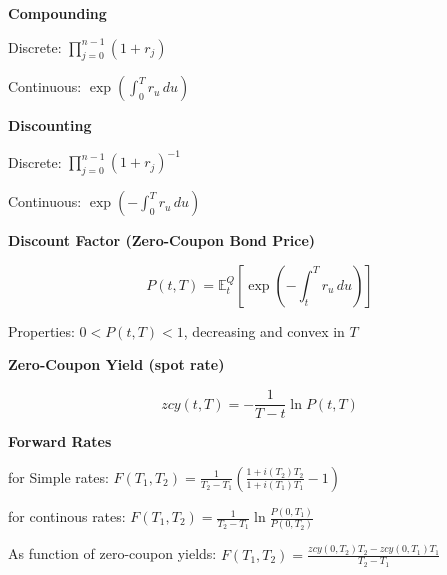 \documentclass[12pt,a4paper]{article}
\begin{document}
\textbf{Compounding}
\vspace{0.5em}

Discrete: $\prod_{j=0}^{n-1} (1 + r_j)$ \quad [$r_j$ = spot rate at beginning of period $j$]

Continuous: $\exp\left(\int_0^T r_u \, du\right)$ \quad [$\{r_u\}_{u \geq 0}$ = stochastic process for instantaneous risk-free rate]

\vspace{0.5em}

\textbf{Discounting}
\vspace{0.5em}

Discrete: $\prod_{j=0}^{n-1} (1 + r_j)^{-1}$ 

Continuous: $\exp\left(-\int_0^T r_u \, du\right)$

\vspace{0.5em}




\textbf{Discount Factor (Zero-Coupon Bond Price)}
\vspace{0.5em}


$$P(t,T) = \mathbb{E}_t^Q\left[\exp\left(-\int_t^T r_u \, du\right)\right]$$


Properties: $0 < P(t,T) < 1$, decreasing and convex in $T$

\vspace{0.5em}

\textbf{Zero-Coupon Yield (spot rate)}
\vspace{0.5em}

$$zcy(t,T) = -\frac{1}{T-t} \ln P(t,T)$$

\vspace{0.5em}

\textbf{Forward Rates}
\vspace{0.5em}

for Simple rates: $F(T_1, T_2) = \frac{1}{T_2 - T_1}\left(\frac{1 + i(T_2)T_2}{1 + i(T_1)T_1} - 1\right)$

for continous rates: $F(T_1, T_2) = \frac{1}{T_2 - T_1} \ln\frac{P(0,T_1)}{P(0,T_2)}$

As function of zero-coupon yields: $F(T_1, T_2) = \frac{zcy(0,T_2)T_2 - zcy(0,T_1)T_1}{T_2 - T_1}$
\end{document}
